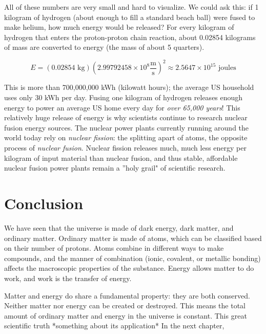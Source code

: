 All of these numbers are very small and hard to visualize. We could ask this: if 
1 kilogram of hydrogen (about enough to fill a standard beach ball) were fused to 
make helium, how much energy would be released? For every kilogram of hydrogen 
that enters the proton-proton chain reaction, about 0.02854 kilograms of mass are 
converted to energy (the mass of about 5 quarters).

$$E = \left( 0.02854 \text{ kg} \right) \left( 2.99792458 \times 10^8 \frac{
\text{m}}{\text{s}} \right)^2 \approx 2.5647 \times 10^{15} \text{ joules}$$

This is more than 700,000,000 kWh (kilowatt hours); the average US household 
uses only 30 kWh per day. Fusing one kilogram of hydrogen releases enough energy 
to power an average US home every day for \textit{over 65,000 years}! This 
relatively huge release of energy is why scientists continue to research nuclear 
fusion energy sources. The nuclear power plants currently running around the world 
today rely on \textit{nuclear fission}: the splitting apart of atoms, the opposite 
process of \textit{nuclear fusion}. Nuclear fission releases much, much less energy 
per kilogram of input material than nuclear fusion, and thus stable, affordable 
nuclear fusion power plants remain a ''holy grail" of scientific research. 

\section{Conclusion}
We have seen that the universe is made of dark energy, dark matter, and ordinary matter. Ordinary matter is made of atoms, which can be classified based on their number of protons. Atoms combine in different ways to make compounds, and the manner of combination (ionic, covalent, or metallic bonding) affects the macroscopic properties of the substance. Energy allows matter to do work, and work is the transfer of energy. 

Matter and energy do share a fundamental property: they are both conserved. Neither matter nor energy can be created or destroyed. This means the total amount of ordinary matter and energy in the universe is constant. This great scientific truth *something about its application* In the next chapter, 








